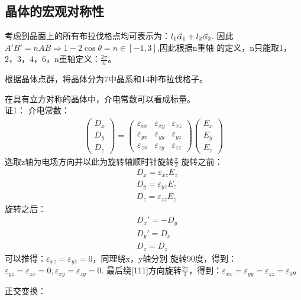 \documentclass[UTF8]{article}
\numberwithin{equation}{section}
\begin{document}
\subsection{晶体的宏观对称性}
考虑到晶面上的所有布拉伐格点均可表示为：$l_1\va{\alpha}_1+l_2\va{\alpha}_2$.
因此$A'B'=nAB\Rightarrow 1-2\cos \theta = n \in [-1,3]$,因此根据n重轴
的定义，n只能取1，2，3，4，6，n重轴定义：$\frac{2\pi}{n}$。

根据晶体点群，将晶体分为7中晶系和14种布拉伐格子。

在具有立方对称的晶体中，介电常数可以看成标量。\\
证1：
介电常数：
\begin{align*}
    \left(\begin{array}{c}
              D_x \\D_y\\D_z
          \end{array}\right)=
    \left(\begin{array}{ccc}
              \varepsilon_{xx} & \varepsilon_{xy} & \varepsilon_{xz} \\
              \varepsilon_{yx} & \varepsilon_{yy} & \varepsilon_{yz} \\
              \varepsilon_{zx} & \varepsilon_{zy} & \varepsilon_{zz}
          \end{array}
    \right)
    \left(\begin{array}{c}
              E_x \\E_y \\E_z
          \end{array}\right)
\end{align*}
选取z轴为电场方向并以此为旋转轴顺时针旋转$\frac{\pi}{2}$
旋转之前：
\begin{align*}
     & D_x=\varepsilon_{xz}E_z \\
     & D_y=\varepsilon_{yz}E_z \\
     & D_z=\varepsilon_{zz}E_z
\end{align*}
旋转之后：
\begin{align*}
     & D_x'=-D_y \\
     & D_y'=D_x  \\
     & D_z=D_z
\end{align*}
可以推得：$\varepsilon_{xz}=\varepsilon_{yz}=0$，同理绕x，y轴分别
旋转90度，得到：$\varepsilon_{yz}=\varepsilon_{zx}=0,\varepsilon_{xy}=\varepsilon_{zy}=0$.
最后绕[111]方向旋转$\frac{2\pi}{3}$，得到：$\varepsilon_{xx}=\varepsilon_{yy}=\varepsilon_{zz}=\varepsilon_0$。

正交变换：
\end{document}
